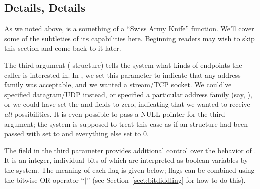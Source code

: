 \subsection{Details, Details}
\label{sect:gaiadv}
As we noted above,  is a something of a ``Swiss
Army Knife'' function.  We'll cover some of the subtleties of
its capabilities here.
%
Beginning readers may wish to skip this section and come back
to it later.

The third argument ( structure) tells the system what
kinds of endpoints the caller is interested in.  In
, we set this parameter to indicate
that any address family was acceptable,
and we wanted a stream/TCP socket.  We could've specified
datagram/UDP instead, or specified a particular address family (say,
), or we could have set the  and
 fields to zero, indicating that we wanted to
receive \emph{all\/} possibilities.  It is even possible to pass a
NULL pointer for the third argument; the system is supposed to treat
this case as if an  structure had been passed with
 set to  and everything else set
to 0.


The  field in the third parameter provides
additional control over the behavior of .
It is an integer, individual bits of which are interpreted as boolean
variables by the system.  The meaning of each flag is given below;
flags can be combined 
using the bitwise OR operator ``$\mid$'' (see Section~\ref{sect:bitdiddling} for
how to do this).

